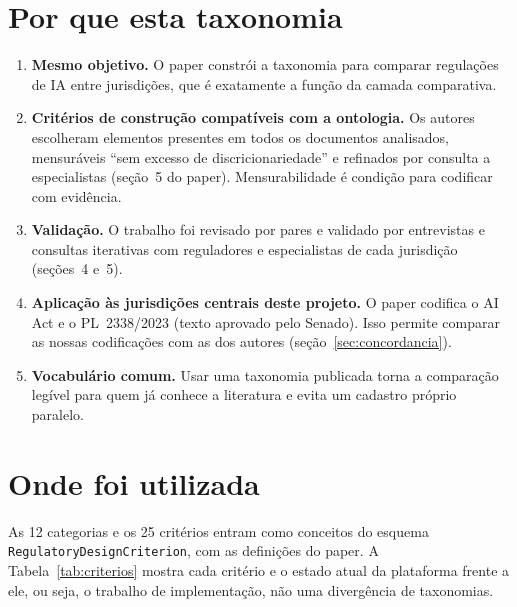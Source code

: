 \documentclass[12pt,a4paper,oneside,english,brazil]{abntex2}
\begin{document}
\section{Por que esta taxonomia}\label{sec:porque}
\begin{enumerate}[leftmargin=*]
  \item \textbf{Mesmo objetivo.} O paper constrói a taxonomia para comparar regulações de IA entre jurisdições, que é exatamente a função da camada comparativa.
  \item \textbf{Critérios de construção compatíveis com a ontologia.} Os autores escolheram elementos presentes em todos os documentos analisados, mensuráveis ``sem excesso de discricionariedade'' e refinados por consulta a especialistas (seção~5 do paper). Mensurabilidade é condição para codificar com evidência.
  \item \textbf{Validação.} O trabalho foi revisado por pares e validado por entrevistas e consultas iterativas com reguladores e especialistas de cada jurisdição (seções~4 e~5).
  \item \textbf{Aplicação às jurisdições centrais deste projeto.} O paper codifica o AI Act e o PL~2338/2023 (texto aprovado pelo Senado). Isso permite comparar as nossas codificações com as dos autores (seção~\ref{sec:concordancia}).
  \item \textbf{Vocabulário comum.} Usar uma taxonomia publicada torna a comparação legível para quem já conhece a literatura e evita um cadastro próprio paralelo.
\end{enumerate}

\section{Onde foi utilizada}\label{sec:onde}
As 12 categorias e os 25 critérios entram como conceitos do esquema \texttt{Regulatory\allowbreak Design\allowbreak Criterion}, com as definições do paper. A Tabela~\ref{tab:criterios} mostra cada critério e o estado atual da plataforma frente a ele, ou seja, o trabalho de implementação, não uma divergência de taxonomias.
\end{document}
